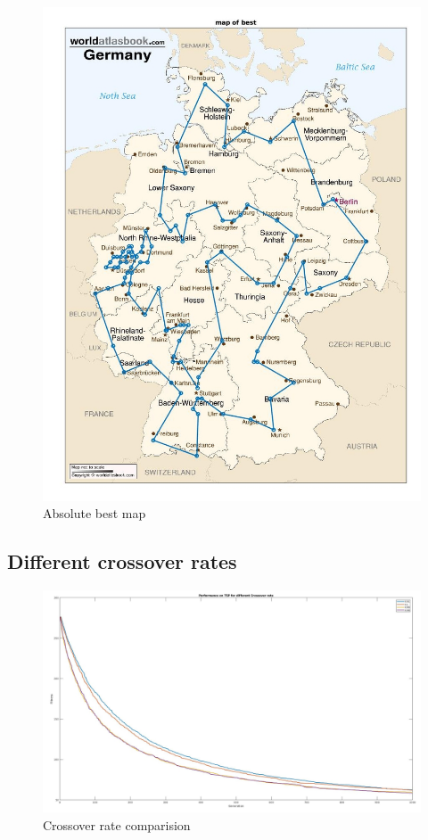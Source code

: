 \documentclass[a4paper, 12pt]{article}
\begin{document}
\begin{figure}[h!]
  \centering
  \includegraphics[width=1.0\textwidth]{images/BestPath_ultimate.jpg}
    \caption{Absolute best map \label{fig:absBest}}
\end{figure}

\newpage
\subsection{Different crossover rates}

\begin{figure}[ht!]
	\centering
	\includegraphics[width=1.0\textwidth]{images/crossover_exp_98.jpg}
	\caption{Crossover rate comparision\label{fig:crossfig}}
\end{figure}
\end{document}
